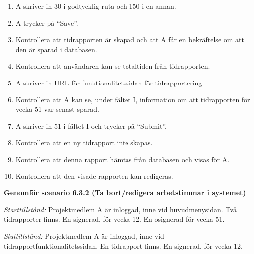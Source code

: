 \documentclass[a4paper]{article}
\begin{document}
\begin{ST}
\begin{enumerate}
\item A skriver in 30 i godtycklig ruta och 150 i en annan.
\item A trycker på ``Save''.
\item Kontrollera att tidrapporten är skapad och att A får en bekräftelse om att den är sparad i databasen.
\item Kontrollera att användaren kan se totaltiden från tidrapporten.
\item A skriver in URL för funktionalitetssidan för tidrapportering.
\item Kontrollera att A kan se, under fältet I, information om att tidrapporten för vecka 51 var senast sparad.
\item A skriver in 51 i fältet I och trycker på ``Submit''.
\item Kontrollera att en ny tidrapport inte skapas.
\item Kontrollera att denna rapport hämtas från databasen och visas för A.
\item Kontrollera att den visade rapporten kan redigeras.

\end{enumerate}

\item
\textbf{Genomför scenario 6.3.2 (Ta bort/redigera arbetstimmar i systemet)}

\emph{Starttillstånd:} Projektmedlem A är inloggad, inne vid huvudmenysidan. Två tidrapporter finns. En signerad, för vecka 12. En osignerad för vecka 51.

\emph{Sluttillstånd:} Projektmedlem A är inloggad, inne vid tidrapportfunktionalitetssidan. En tidrapport finns. En signerad, för vecka 12.


\end{ST}
\end{document}
